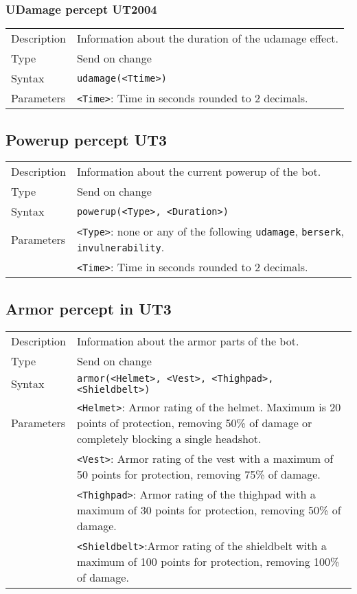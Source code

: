 \documentclass[11pt,a4paper]{article}
\begin{document}
\subsubsection*{UDamage percept UT2004}
\begin{small}
\begin{tabular}{p{2cm}p{9cm}}
Description & Information about the duration of the udamage effect.\\
Type & Send on change\\
Syntax & \verb|udamage(<Ttime>)|\\
Parameters & 
\verb|<Time>|: Time in seconds rounded to 2 decimals.\\
\end{tabular}
\end{small}

\subsection*{Powerup percept UT3}
\begin{small}
\begin{tabular}{p{2cm}p{9cm}}
Description & Information about the current powerup of the bot.\\
Type & Send on change\\
Syntax & \verb|powerup(<Type>, <Duration>)|\\
Parameters & 
\verb|<Type>|: none or any of the following \verb|udamage|, \verb|berserk|, \verb|invulnerability|. \\
& \verb|<Time>|: Time in seconds rounded to 2 decimals.\\
\end{tabular}
\end{small}

\subsection*{Armor percept in UT3}
\begin{small}
\begin{tabular}{p{2cm}p{9cm}}
Description & Information about the armor parts of the bot.\\
Type & Send on change\\
Syntax & \verb|armor(<Helmet>, <Vest>, <Thighpad>, <Shieldbelt>)|\\
Parameters

 & \verb|<Helmet>|: Armor rating of the helmet. Maximum is 20 points of protection, removing 50\% of damage or completely blocking a single headshot.\\ 
 & \verb|<Vest>|: Armor rating of the vest with a maximum of 50 points for protection, removing 75\% of damage.\\ 
 & \verb|<Thighpad>|: Armor rating of the thighpad with a maximum of 30 points for protection, removing 50\% of damage.\\ 
 & \verb|<Shieldbelt>|:Armor rating of the shieldbelt with a maximum of 100 points for protection, removing 100\% of damage.\\ 
\end{tabular}
\end{small}
	
\end{document}
